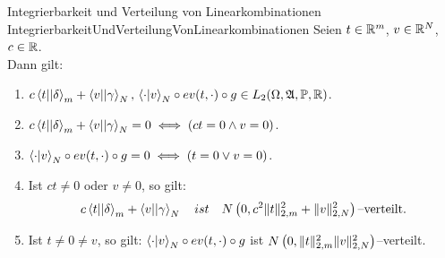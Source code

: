 \begin{lemma}{Integrierbarkeit und Verteilung von Linearkombinationen}
             {IntegrierbarkeitUndVerteilungVonLinearkombinationen}
Seien $t \in \mathbb{R}^m$, $v \in \mathbb{R}^N$, $c \in \mathbb{R}$.\\
Dann gilt:
\begin{enumerate}[(1)]
\item\label{IntegrierbarkeitUndVerteilungVonLinearkombinationen1}
$c\left\langle t ||\delta\right\rangle_m + \left\langle v ||\gamma\right\rangle_N, \, 
\left\langle \cdot |v\right\rangle_N \circ ev(t, \cdot) \circ g \in L_2(\Omega,\mathfrak{A},\mathbb{P},\mathbb{R})$.
\item\label{IntegrierbarkeitUndVerteilungVonLinearkombinationen2}
$c\left\langle t ||\delta\right\rangle_m + \left\langle v ||\gamma\right\rangle_N = 0 \iff (ct = 0 \wedge v = 0)$.
\item\label{IntegrierbarkeitUndVerteilungVonLinearkombinationen3}
$\left\langle \cdot |v\right\rangle_N \circ ev(t, \cdot) \circ g = 0 \iff (t = 0 \vee v= 0)$.
\item\label{IntegrierbarkeitUndVerteilungVonLinearkombinationen4}
Ist $ct \neq 0$ oder $v \neq 0$, so gilt:
\[c\left\langle t ||\delta\right\rangle_m + \left\langle v ||\gamma\right\rangle_N \quad{ist}\quad
N\left(0, c^2\lVert t\rVert_{2,m}^2 +\lVert v\rVert_{2, N}^2\right)\text{--verteilt.}\]
\item\label{IntegrierbarkeitUndVerteilungVonLinearkombinationen5}
Ist $t \neq 0\neq v $, so gilt:
$\left\langle \cdot |v\right\rangle_N \circ ev(t, \cdot) \circ g$ ist
$N\left(0, \lVert t\rVert _{2,m}^2\lVert v\rVert _{2, N}^2\right)$--verteilt.
\end{enumerate}
\end{lemma}
